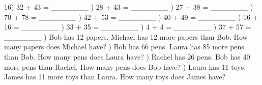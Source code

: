 \documentclass{article}%
\begin{document}
16) 32 + 43 = \_\_\_\_\_\_\_%
\newline%
\newline%
) 28 + 43 = \_\_\_\_\_\_\_%
\newline%
\newline%
) 27 + 38 = \_\_\_\_\_\_\_%
\newline%
\newline%
) 70 + 78 = \_\_\_\_\_\_\_%
\newline%
\newline%
) 42 + 53 = \_\_\_\_\_\_\_%
\newline%
\newline%
) 40 + 49 = \_\_\_\_\_\_\_%
\newline%
\newline%
) 16 + 16 = \_\_\_\_\_\_\_%
\newline%
\newline%
) 33 + 35 = \_\_\_\_\_\_\_%
\newline%
\newline%
) 4 + 4 = \_\_\_\_\_\_\_%
\newline%
\newline%
) 37 + 57 = \_\_\_\_\_\_\_%
\newline%
\newline%
) Bob has 12 papers. Michael has 12 more papers than Bob. How many papers does Michael have?%
\newline%
\newline%
) Bob has 66 pens. Laura has 85 more pens than Bob. How many pens does Laura have?%
\newline%
\newline%
) Rachel has 26 pens. Bob has 40 more pens than Rachel. How many pens does Bob have?%
\newline%
\newline%
) Laura has 11 toys. James has 11 more toys than Laura. How many toys does James have?%
\end{document}
